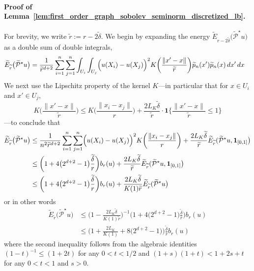 \documentclass{article}
\newcommand{\1}{\mathbf{1}}
\newcommand{\mc}[1]{\mathcal{#1}}
\newcommand{\wt}[1]{\widetilde{#1}}
\theoremstyle{alden}
\theoremstyle{aldenthm}
\theoremstyle{definition}
\theoremstyle{remark}
\begin{document}
\paragraph{Proof of Lemma~\ref{lem:first_order_graph_sobolev_seminorm_discretized_lb}.}
For brevity, we write $\wt{r} := r - 2\wt{\delta}$. We begin by expanding the energy $\wt{E}_{r - 2\wt{\delta}}\bigl(\wt{\mc{P}}^{\star}u\bigr)$ as a double sum of double integrals,
\begin{align*}
\wt{E}_{\wt{r}}\bigl(\wt{\mc{P}}^{\star}u\bigr) & = \frac{1}{\wt{r}^{d + 2}} \sum_{i = 1}^{n} \sum_{j = 1}^{n} \int_{U_i} \int_{U_j} \Bigl(u(X_i) - u(X_j)\Bigr)^2 K\biggl(\frac{\|x' - x\|}{\wt{r}}\biggr) \wt{p}_n(x') \wt{p}_n(x) \,dx' \,dx
\end{align*}
We next use the Lipschitz property of the kernel $K$---in particular that for $x \in U_i$ and $x' \in U_j$,
\begin{equation*}
K\biggl(\frac{\|x' - x\|}{\wt{r}}\biggr) \leq K\biggl(\frac{\|x_i - x_j\|}{r}\biggr) + \frac{2L_K\wt{\delta}}{\wt{r}} \cdot \1\biggl\{\frac{\|x' - x\|}{\wt{r}} \leq 1\biggr\}
\end{equation*}
---to conclude that
\begin{align}
\wt{E}_{\wt{r}}\bigl(\wt{\mc{P}}^{\star}u\bigr) & \leq \frac{1}{n^2\wt{r}^{d + 2}} \sum_{i = 1}^{n} \sum_{j = 1}^{n} \Bigl(u(X_i) - u(X_j)\Bigr)^2 K\biggl(\frac{\|x_i - x_j\|}{r}\biggr) + \frac{2L_K\wt{\delta}}{\wt{r}}\wt{E}_{\wt{r}}(\wt{\mc{P}}^{\star}u,\1_{[0,1]}\bigr) \nonumber \\
& \leq \biggl(1 + 4\bigl(2^{d + 2} - 1\bigr)\frac{\wt{\delta}}{r}\biggr) b_r(u) + \frac{2L_K\wt{\delta}}{\wt{r}}\wt{E}_{\wt{r}}(\wt{\mc{P}}^{\star}u,\1_{[0,1]}\bigr) \nonumber \\
& \leq \biggl(1 + 4\bigl(2^{d + 2} - 1\bigr)\frac{\wt{\delta}}{r}\biggr) b_r(u) + \frac{2L_K\wt{\delta}}{K(1)\wt{r}} \wt{E}_{\wt{r}}(\wt{\mc{P}}^{\star}u\bigr) \nonumber 
\end{align}
or in other words
\begin{align*}
\wt{E}_{\wt{r}}\bigl(\wt{\mc{P}}^{\star}u\bigr) & \leq \biggl(1 - \frac{2L_K\wt{\delta}}{K(1)\wt{r}}\biggr)^{-1}\biggl(1 + 4\bigl(2^{d + 2} - 1\bigr)\frac{\wt{\delta}}{r}\biggr) b_r(u) \\
& \leq \biggl(1 + \frac{2L_K}{K(1)} + 8\bigl(2^{d + 2} - 1\bigr)\biggr) \frac{\wt{\delta}}{r}b_r(u)
\end{align*}
where the second inequality follows from the algebraic identities $(1 - t)^{-1} \leq (1 + 2t)$ for any $0 < t < 1/2$ and $(1 + s)(1 + t) < 1 + 2s + t$ for any $0 < t < 1$ and $s > 0$.
\end{document}
